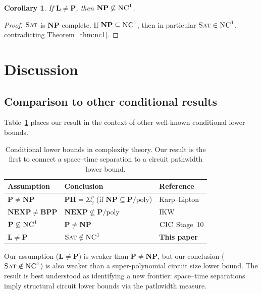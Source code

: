 \documentclass[11pt]{article}
\newtheorem{corollary}[theorem]{Corollary}
\newcommand{\SAT}{\textsc{Sat}}
\newcommand{\CIC}{\textsc{CIC}}
\newcommand{\poly}{\mathrm{poly}}
\newcommand{\NC}{\textsc{NC}}
\begin{document}
\begin{corollary}
  \label{cor:np-nc1}
  If $\mathbf{L} \neq \mathbf{P}$, then $\mathbf{NP} \not\subseteq \NC^1$.
\end{corollary}

\begin{proof}
  $\SAT$ is $\mathbf{NP}$-complete.  If $\mathbf{NP} \subseteq \NC^1$, then in
  particular $\SAT \in \NC^1$, contradicting Theorem~\ref{thm:nc1}.
\end{proof}

\section{Discussion}

\subsection{Comparison to other conditional results}

Table~\ref{tab:comparison} places our result in the context of other
well-known conditional lower bounds.

\begin{table}[h]
\centering
\begin{tabular}{lll}
\hline
\textbf{Assumption} & \textbf{Conclusion} & \textbf{Reference} \\
\hline
$\mathbf{P} \neq \mathbf{NP}$ & $\mathbf{PH} = \Sigma^p_2$ (if $\mathbf{NP} \subseteq \mathbf{P}/\poly$) & Karp--Lipton~\cite{KL80} \\
$\mathbf{NEXP} \neq \mathbf{BPP}$ & $\mathbf{NEXP} \not\subseteq \mathbf{P}/\poly$ & IKW~\cite{IKW02} \\
$\mathbf{P} \not\subseteq \NC^1$ & $\mathbf{P} \neq \mathbf{NP}$ & $\CIC$ Stage~10 \\
$\mathbf{L} \neq \mathbf{P}$ & $\SAT \notin \NC^1$ & \textbf{This paper} \\
\hline
\end{tabular}
\caption{Conditional lower bounds in complexity theory.  Our result is the
first to connect a space--time separation to a circuit pathwidth lower bound.}
\label{tab:comparison}
\end{table}

Our assumption ($\mathbf{L} \neq \mathbf{P}$) is weaker than
$\mathbf{P} \neq \mathbf{NP}$, but our conclusion ($\SAT \notin \NC^1$) is
also weaker than a super-polynomial circuit size lower bound.  The result is
best understood as identifying a new frontier: space--time separations imply
structural circuit lower bounds via the pathwidth measure.
\end{document}
